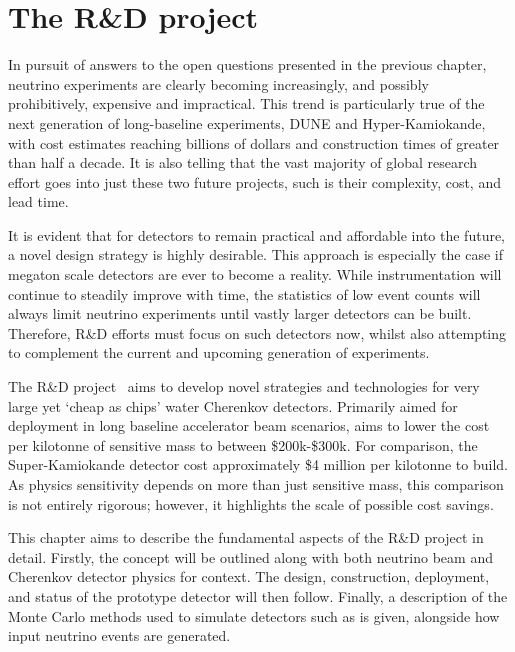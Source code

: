 \chapter{The \chips R\&D project} %
\label{chap:chips}

In pursuit of answers to the open questions presented in the previous chapter, neutrino
experiments are clearly becoming increasingly, and possibly prohibitively, expensive and
impractical. This trend is particularly true of the next generation of long-baseline experiments,
DUNE and Hyper-Kamiokande, with cost estimates reaching billions of dollars and construction times
of greater than half a decade. It is also telling that the vast majority of global research effort
goes into just these two future projects, such is their complexity, cost, and lead time.

It is evident that for detectors to remain practical and affordable into the future, a novel
design strategy is highly desirable. This approach is especially the case if megaton scale
detectors are ever to become a reality. While instrumentation will continue to steadily improve
with time, the statistics of low event counts will always limit neutrino experiments until vastly
larger detectors can be built. Therefore, R\&D efforts must focus on such detectors now, whilst
also attempting to complement the current and upcoming generation of experiments.

The \chips R\&D project~\cite{adamson2013} aims to develop novel strategies and technologies for
very large yet `cheap as chips' water Cherenkov detectors. Primarily aimed for deployment in long
baseline accelerator beam scenarios, \chips aims to lower the cost per kilotonne of sensitive mass
to between \$200k-\$300k. For comparison, the Super-Kamiokande detector cost approximately \$4
million per kilotonne to build. As physics sensitivity depends on more than just sensitive mass,
this comparison is not entirely rigorous; however, it highlights the scale of possible cost
savings.

This chapter aims to describe the fundamental aspects of the \chips R\&D project in detail.
Firstly, the \chips concept will be outlined along with both neutrino beam and Cherenkov detector
physics for context. The design, construction, deployment, and status of the \chipsfive prototype
detector will then follow. Finally, a description of the Monte Carlo methods used to simulate
\chips detectors such as \chipsfive is given, alongside how input neutrino events are generated.

